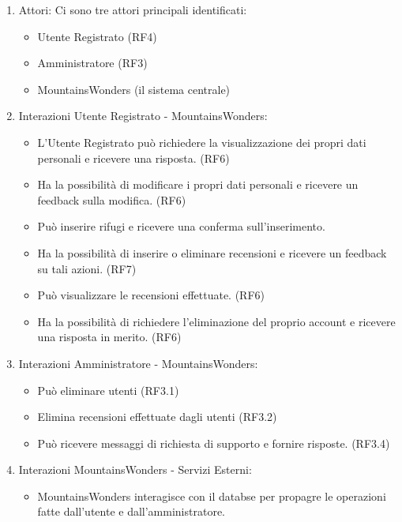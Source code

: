 \documentclass[a4paper,12pt]{article}
\begin{document}
\begin{enumerate}
    \item Attori: Ci sono tre attori principali identificati:
    \begin{itemize}
        \item Utente Registrato (RF4)
        \item Amministratore (RF3)
        \item MountainsWonders (il sistema centrale)
    \end{itemize}


    
    \item Interazioni Utente Registrato - MountainsWonders:
    \begin{itemize}
        \item L'Utente Registrato può richiedere la visualizzazione dei propri dati personali e ricevere una risposta. (RF6)
        \item Ha la possibilità di modificare i propri dati personali e ricevere un feedback sulla modifica. (RF6) 
        \item Può inserire rifugi e ricevere una conferma sull'inserimento.
        \item Ha la possibilità di inserire o eliminare recensioni e ricevere un feedback su tali azioni. (RF7)
        \item Può visualizzare le recensioni effettuate. (RF6) 
        \item  Ha la possibilità di richiedere l'eliminazione del proprio account e ricevere una risposta in merito. (RF6)
    \end{itemize}

    
    \item Interazioni Amministratore - MountainsWonders:
    \begin{itemize}
        \item Può eliminare utenti (RF3.1)
        \item Elimina recensioni effettuate dagli utenti (RF3.2)
        \item Può ricevere messaggi di richiesta di supporto e fornire risposte. (RF3.4)
    \end{itemize}
    
    \item Interazioni MountainsWonders - Servizi Esterni:
    \begin{itemize}
        \item  MountainsWonders interagisce con il databse per propagre le operazioni fatte dall'utente e dall'amministratore.
        
    \end{itemize}
\end{enumerate}
\end{document}
